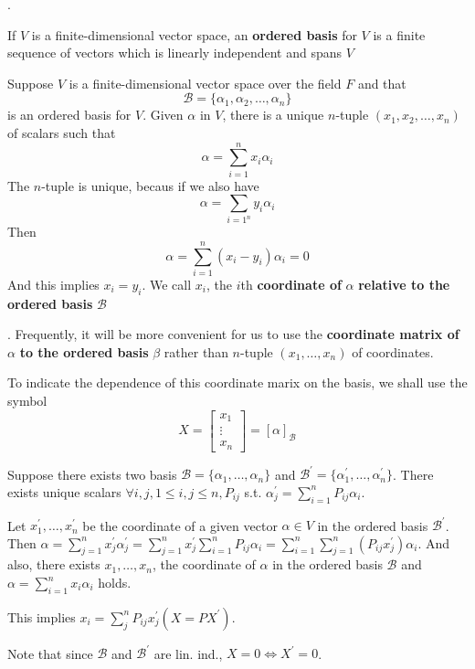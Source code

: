\documentclass[8pt]{beamer}
\newcommand{\mc}[1]{\mathcal{#1}}
\newcommand{\tb}[1]{\textbf{#1}}
\begin{document}
\begin{frame}{.}
    \begin{definition}
        If $V$ is a finite-dimensional vector space, an \tb{ordered basis} for $V$ is a finite sequence of vectors which is linearly independent and spans $V$
    \end{definition}
    Suppose $V$ is a finite-dimensional vector space over the field $F$ and that 
    \[
    \mc{B} = \{\alpha_1, \alpha_2, \dots, \alpha_n\}
    \]
    is an ordered basis for $V$. Given $\alpha$ in $V$, there is a unique $n$-tuple $(x_1, x_2, \dots, x_n)$ of scalars such that 
    \[
    \alpha = \sum_{i=1}^n x_i \alpha_i
    \]
    The $n$-tuple is unique, becaus if we also have 
    \[
    \alpha = \sum_{i=1^n}y_i \alpha_i
    \]
    Then 
    \[
    \alpha = \sum_{i=1}^n (x_i - y_i)\alpha_i = 0
    \]
    And this implies $x_i = y_i$. We call $x_i$, the $i$th \tb{coordinate of }$\alpha$ \tb{relative to the ordered basis} $\mc{B}$
\end{frame}

\begin{frame}{.}
    Frequently, it will be more convenient for us to use the \tb{coordinate matrix of }$\alpha$ \tb{to the ordered basis }$\beta$ rather than $n$-tuple $(x_1, \dots, x_n)$ of coordinates.

    To indicate the dependence of this coordinate marix on the basis, we shall use the symbol
    \[
    X = \left[\begin{matrix} x_1 \\ \vdots \\ x_n \end{matrix}\right] = [\alpha]_{\mc{B}}
    \]

    \bigskip

    Suppose there exists two basis $\mc{B} = \{\alpha_1, \dots, \alpha_n \}$ and $\mc{B}^\prime = \{\alpha^\prime_1, \dots, \alpha^\prime_n\}$. There exists unique scalars $\forall i, j, 1\leq i,j \leq n, P_{ij}$ s.t. $\alpha^\prime_j = \sum_{i=1}^n P_{ij} \alpha_i$. 
    
    Let $x_1^\prime, \dots, x^\prime_n$ be the coordinate of a given vector $\alpha \in V$ in the ordered basis $\mc{B}^\prime$. Then $\alpha = \sum_{j=1}^n x^\prime_j \alpha^\prime_j = \sum^n_{j=1} x^\prime_j \sum_{i=1}^n P_{ij} \alpha_i = \sum_{i=1}^n \sum_{j=1}^n (P_{ij} x^\prime_j) \alpha_i$. And also, there exists $x_1, \dots, x_n$, the coordinate of $\alpha$ in the ordered basis $\mc{B}$ and $\alpha = \sum_{i=1}^n x_i \alpha_i$ holds.

    This implies $x_i = \sum_{j}^n P_{ij} x^\prime_j (X = PX^\prime)$.
    
    \smallskip

    Note that since $\mc{B}$ and $\mc{B}^\prime$ are lin. ind., $X = 0 \iff X^\prime = 0$.


\end{frame}
\end{document}

